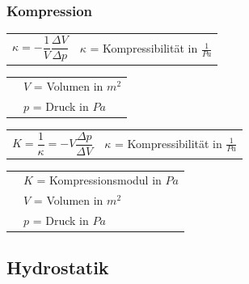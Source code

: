 	\subsubsection{Kompression}
		\begin{minipage}[t]{13cm}
				\renewcommand{\arraystretch}{2.5}
				\begin{tabular}{ p{4cm} | p{7cm}}
					$\kappa = -\dfrac{1}{V} \dfrac{\Delta V}{\Delta p}$	&	$\kappa$ = Kompressibilität in $\frac{1}{Pa}$\\
				\end{tabular}
				\renewcommand{\arraystretch}{1.5}
				\begin{tabular}{ p{4cm} | p{7cm} }
					& $V$ = Volumen in $m^2$\\
					& $p$ = Druck in $Pa$\\
				\end{tabular} 
				\renewcommand{\arraystretch}{1}
		\end{minipage}
		\newline
		\begin{minipage}[t]{13cm}
			\renewcommand{\arraystretch}{2.5}
			\begin{tabular}{ p{4cm} | p{7cm}}
				$K = \dfrac{1}{\kappa} = -V \dfrac{\Delta p}{\Delta V}$	&	$\kappa$ = Kompressibilität in $\frac{1}{Pa}$\\
			\end{tabular}
			\renewcommand{\arraystretch}{1.5}
			\begin{tabular}{ p{4cm} | p{7cm} }
				& $K$ = Kompressionsmodul in $Pa$\\
				& $V$ = Volumen in $m^2$\\
				& $p$ = Druck in $Pa$\\
			\end{tabular} 
			\renewcommand{\arraystretch}{1}
		\end{minipage}

\newpage	
\subsection{Hydrostatik}
